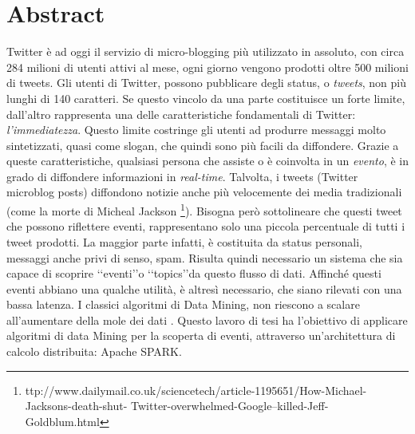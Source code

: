 
\cleardoublepage
\chapter*{Abstract}
Twitter è ad oggi il servizio di micro-blogging più utilizzato in assoluto, con circa 284 milioni di utenti attivi al mese, ogni giorno vengono prodotti oltre 500 milioni di tweets. Gli utenti di Twitter, possono pubblicare degli status, o \emph{tweets}, non  più lunghi di 140 caratteri. Se questo vincolo da una parte costituisce un forte limite, dall'altro rappresenta una delle caratteristiche fondamentali di Twitter: \emph{l'immediatezza}. Questo limite costringe gli utenti ad produrre messaggi molto sintetizzati, quasi come slogan, che quindi sono più facili da diffondere. Grazie a queste caratteristiche, qualsiasi persona che assiste o è coinvolta in un \emph{evento}, è in grado di diffondere informazioni in \emph{real-time}.
Talvolta, i tweets (Twitter microblog posts) diffondono notizie anche più velocemente dei media tradizionali (come la morte di Micheal Jackson \footnote{ttp://www.dailymail.co.uk/sciencetech/article-1195651/How-Michael-Jacksons-death-shut-
Twitter-overwhelmed-Google–killed-Jeff-Goldblum.html}).
Bisogna però sottolineare che questi tweet che possono riflettere eventi, rappresentano solo una piccola percentuale di tutti i tweet prodotti. La maggior parte infatti, è costituita da status personali, messaggi anche privi di senso, spam. Risulta quindi necessario un sistema che sia capace di scoprire \lq\lq eventi\rq\rq o \lq\lq topics\rq\rq   da questo flusso di dati.  Affinché questi eventi abbiano una qualche utilità, è altresì necessario, che siano  rilevati con una bassa latenza. I classici algoritmi di Data Mining, non riescono a scalare all'aumentare della mole dei dati . Questo lavoro di tesi ha l'obiettivo di applicare algoritmi di data Mining per la scoperta di eventi, attraverso un'architettura di calcolo distribuita: Apache SPARK. 

